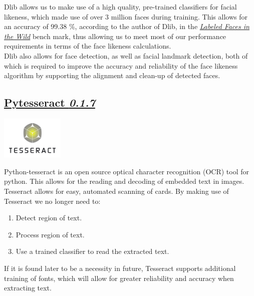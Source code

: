 \documentclass{article}
\begin{document}
		\noindent
		Dlib allows us to make use of a high quality, pre-trained classifiers
		for facial likeness, which made use of over 3 million faces 
		during training. This allows for an accuracy of 99.38 \%, according to the author of Dlib, in the
		\href{http://vis-www.cs.umass.edu/lfw/}
		{\textit{Labeled Faces in the Wild}}
		bench mark, thus allowing us to meet most of our performance requirements
		in terms of the face likeness calculations. \\

		\noindent
		Dlib also allows for face detection, as well as facial landmark
		detection, both of which is required to improve the
		accuracy and reliability of the face likeness algorithm by supporting
		the alignment and clean-up of detected faces.\\

		\begin{minipage}[b]{0.30\linewidth}
		\subsection{\href{https://pypi.python.org/pypi/pytesseract}{Pytesseract \textit{0.1.7}}}
		\vspace{5mm}
		\end{minipage}
		\begin{minipage}[b]{0.70\linewidth}
			\includegraphics[width=3.0cm]{img/Tesseract.png}
		\end{minipage}
		Python-tesseract is an open source optical 
		character recognition (OCR) tool for python. This allows 
		for the reading and decoding of embedded text in images.\\

		\noindent
		Tesseract allows for easy, automated scanning of cards. By making use
		of Tesseract we no longer need to:
		\begin{enumerate}
			\item Detect region of text.
			\item Process region of text.
			\item Use a trained classifier to read the extracted text.
		\end{enumerate}
		If it is found later to be a necessity in future, Tesseract supports
		additional training of fonts, which will allow for greater
		reliability and accuracy when extracting text.\\
\end{document}

